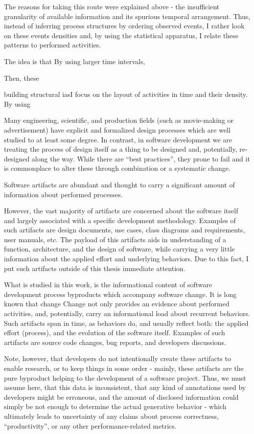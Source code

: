 \documentclass[11pt,oneside]{article}
\numberwithin{equation}{subsection}
\begin{document}
The reasons for taking this route were explained above - the insufficient granularity of
available information and its spurious temporal arrangement. Thus, instead of inferring
process structures by ordering observed events, I rather look on these events densities and, by
using the statistical apparatus, I relate these patterns to performed activities. 

The idea is that 
By using larger
time intervals, 

Then, these

building structural
iasI focus on the layout of activities in time and their density. By using 


Many engineering, scientific, and production fields (such as movie-making or advertisement) have explicit 
and formalized design processes which are well studied to at least some degree. In contrast, in software 
development we are treating the process of design itself as a thing to be designed and, potentially, 
re-designed along the way. While there are ``best practices'', they prone to fail and it is commonplace
to alter these through combination or a systematic change.



Software artifacts are abundant and thought to carry a significant amount of information about performed 
processes.

However, the vast majority of artifacts are concerned about the software itself and largely associated 
with a specific development methodology. Examples of such artifacts are design documents, use cases, class 
diagrams and requirements, user manuals, etc. The payload of this artifacts aids in understanding of 
a function, architecture, and the design of software, while carrying a very little information about the 
applied effort and underlying behaviors. Due to this fact, I put such artifacts outside of this thesis
immediate attention.

What is studied in this work, is the informational content of software development process byproducts 
which accompany software change. It is long known that change Change not only provides an evidence about performed activities, and, potentially, 
carry an informational load about
recurrent behaviors. Such artifacts span in time, as behaviors do, and usually reflect both: the applied 
effort (process), and the evolution of the software itself. 
Examples of such artifacts are source code changes, bug reports, and developers discussions.

Note, however, that developers do not intentionally create these artifacts to enable research, or to keep 
things in some order - mainly, these artifacts are the pure byproduct helping to the development of a 
software project. Thus, we must assume here, that this data is inconsistent, that any kind of annotations 
used by developers might be erroneous, and the amount of disclosed information could simply be not enough
to determine the actual generative behavior - which ultimately leads to uncertainty of any claims about
process correctness, ``productivity'', or any other performance-related metrics. 
\end{document}

